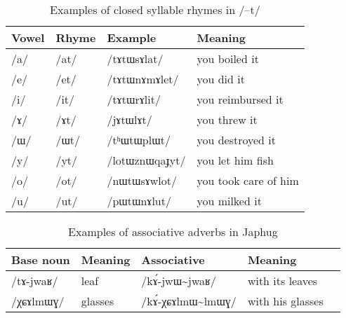 \documentclass[oldfontcommands,oneside,a4paper,11pt]{article}
\newcommand{\ipa}[1]{\mbox{/#1/}} %
\begin{document}
\begin{table}
 \caption{Examples of closed syllable rhymes in \ipa{--t}} \label{tab:t.rhymes}  \centering
\begin{tabular}{llll}
\toprule
Vowel & Rhyme & Example & Meaning\\
\midrule
\ipa{a} &	   	\ipa{at} &\ipa{tɤtɯsɤlat} &you boiled it\\
\ipa{e} &	  	\ipa{et} &\ipa{tɤtɯnɤmɤlet} & you did it\\
\ipa{i} &	   	\ipa{it} &\ipa{tɤtɯrɤlit} & you reimbursed it\\
\ipa{ɤ} &	   	\ipa{ɤt} &\ipa{jɤtɯlɤt} & you threw it\\
\ipa{ɯ} &	   	\ipa{ɯt} &\ipa{tʰɯtɯplɯt} & you destroyed it \\
\ipa{y} &	 \ipa{yt} &\ipa{lotɯznɯqaɟyt} & you let him fish\\
\ipa{o} & 	\ipa{ot} &\ipa{nɯtɯsɤwlot} & you took care of him\\
\ipa{u} & 	\ipa{ut} & \ipa{pɯtɯnɤlut} & you milked it\\
\bottomrule
\end{tabular}
\end{table}

\begin{table}
 \caption{Examples of associative adverbs in Japhug} \label{tab:assoc.adv}  \centering
\begin{tabular}{lllll}
\toprule
Base noun & Meaning & Associative & Meaning \\
\midrule
\ipa{tɤ-jwaʁ} & leaf & \ipa{kɤ́-jwɯ\textasciitilde{}jwaʁ} & with its leaves\\
\ipa{χɕɤlmɯɣ} & glasses & \ipa{kɤ́-χɕɤlmɯ\textasciitilde{}lmɯɣ} & with his glasses\\
\bottomrule
\end{tabular}
\end{table}
                  
\end{document}
